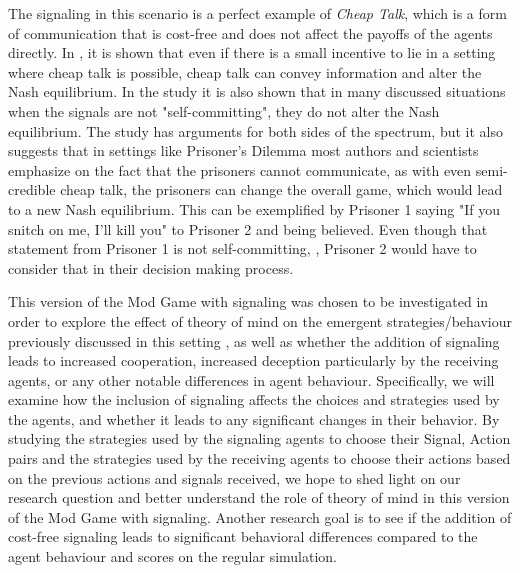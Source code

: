 The signaling in this scenario is a perfect example of \textit{Cheap Talk}, which is a form of communication that is cost-free and does not affect the payoffs of the agents directly. In \cite{farrell1996cheap}, it is shown that even if there is a small incentive to lie in a setting where cheap talk is possible, cheap talk can convey information and alter the Nash equilibrium. In the study it is also shown that in many discussed situations when the signals are not "self-committing", they do not alter the Nash equilibrium. The study has arguments for both sides of the spectrum, but it also suggests that in settings like Prisoner's Dilemma \citep{kuhn1997prisoner} most authors and scientists emphasize on the fact that the prisoners cannot communicate, as with even semi-credible cheap talk, the prisoners can change the overall game, which would lead to a new Nash equilibrium. This can be exemplified by Prisoner 1 saying "If you snitch on me, I'll kill you" to Prisoner 2 and being believed. Even though that statement from Prisoner 1 is not self-committing, \citep{osborne1994course}, Prisoner 2 would have to consider that in their decision making process.

This version of the Mod Game with signaling was chosen to be investigated in order to explore the effect of theory of mind on the emergent strategies/behaviour previously discussed in this setting \citep{veltman2019training}, as well as whether the addition of signaling leads to increased cooperation, increased deception particularly by the receiving agents, or any other notable differences in agent behaviour. Specifically, we will examine how the inclusion of signaling affects the choices and strategies used by the agents, and whether it leads to any significant changes in their behavior. By studying the strategies used by the signaling agents to choose their {Signal, Action} pairs and the strategies used by the receiving agents to choose their actions based on the previous actions and signals received, we hope to shed light on our research question and better understand the role of theory of mind in this version of the Mod Game with signaling. Another research goal is to see if the addition of cost-free signaling leads to significant behavioral differences compared to the agent behaviour and scores on the regular simulation.  